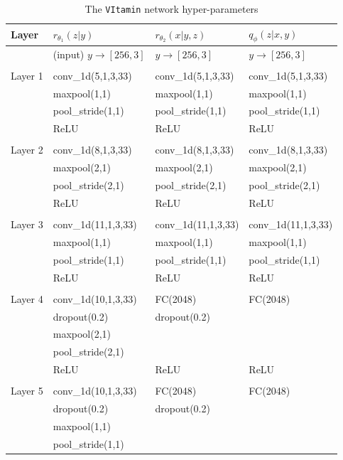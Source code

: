 \documentclass[%
showpacs,
nofootinbib,
 amsmath,amssymb,
 aps,
 twocolumn,
 prl,
 reprint,
floatfix,
]{revtex4-1}
\begin{document}
%
%
\begin{table}
\centering
\caption{The \texttt{VItamin} network hyper-parameters}
\begin{tabularx}{\textwidth}{|X|X|X|X|}
\toprule
Layer & $r_{\theta_1}(z|y)$ & $r_{\theta_2}(x|y,z)$ & $q_{\phi}(z|x,y)$ \\
\hline
& (input) $y\rightarrow[256,3]$ & $y\rightarrow[256,3]$ & $y\rightarrow[256,3]$ \\
& & & \\
\hline
Layer 1 & conv\_1d(5,1,3,33)     & conv\_1d(5,1,3,33) & conv\_1d(5,1,3,33) \\
& maxpool(1,1) & maxpool(1,1) & maxpool(1,1) \\
& pool\_stride(1,1) & pool\_stride(1,1) & pool\_stride(1,1) \\
& ReLU & ReLU & ReLU \\
& & & \\
\hline
Layer 2 & conv\_1d(8,1,3,33) & conv\_1d(8,1,3,33) & conv\_1d(8,1,3,33) \\
& maxpool(2,1) & maxpool(2,1) & maxpool(2,1) \\
& pool\_stride(2,1) & pool\_stride(2,1) & pool\_stride(2,1) \\
& ReLU & ReLU & ReLU \\
& & & \\
\hline
Layer 3 & conv\_1d(11,1,3,33) & conv\_1d(11,1,3,33) & conv\_1d(11,1,3,33) \\
& maxpool(1,1) & maxpool(1,1) & maxpool(1,1) \\
& pool\_stride(1,1) & pool\_stride(1,1) & pool\_stride(1,1) \\
& ReLU & ReLU & ReLU \\
& & & \\
\hline
Layer 4 & conv\_1d(10,1,3,33) & FC(2048) & FC(2048) \\
 & dropout(0.2) & dropout(0.2) & \\
 & maxpool(2,1) & & \\
 & pool\_stride(2,1) & & \\
 & ReLU & ReLU & ReLU \\
 & & & \\
 \hline
Layer 5 & conv\_1d(10,1,3,33) & FC(2048) & FC(2048) \\
 & dropout(0.2) & dropout(0.2) & \\
 & maxpool(1,1) & & \\
 & pool\_stride(1,1) & & \\

\end{tabularx}
\end{table}
\end{document}

